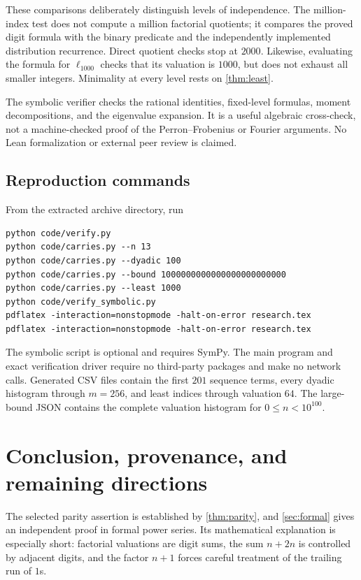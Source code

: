 \documentclass[11pt]{article}
\theoremstyle{definition}\newtheorem{definition}[theorem]{Definition}
\theoremstyle{remark}\newtheorem{remark}[theorem]{Remark}
\begin{document}
These comparisons deliberately distinguish levels of independence.
The million-index test does not compute a million factorial quotients;
it compares the proved digit formula with the binary predicate and the
independently implemented distribution recurrence. Direct quotient
checks stop at $2000$. Likewise, evaluating the formula for $\ell_{1000}$
checks that its valuation is $1000$, but does not exhaust all smaller
integers. Minimality at every level rests on \cref{thm:least}.

The symbolic verifier checks the rational identities, fixed-level
formulas, moment decompositions, and the eigenvalue expansion. It is a
useful algebraic cross-check, not a machine-checked proof of the
Perron--Frobenius or Fourier arguments. No Lean formalization or external
peer review is claimed.

\subsection{Reproduction commands}
From the extracted archive directory, run
\begin{lstlisting}
python code/verify.py
python code/carries.py --n 13
python code/carries.py --dyadic 100
python code/carries.py --bound 1000000000000000000000000
python code/carries.py --least 1000
python code/verify_symbolic.py
pdflatex -interaction=nonstopmode -halt-on-error research.tex
pdflatex -interaction=nonstopmode -halt-on-error research.tex
\end{lstlisting}
The symbolic script is optional and requires SymPy. The main program and
exact verification driver require no third-party packages and make no
network calls. Generated CSV files contain the first $201$ sequence
terms, every dyadic histogram through $m=256$, and least indices through
valuation $64$. The large-bound JSON contains the complete valuation
histogram for $0\leq n<10^{100}$.

\section{Conclusion, provenance, and remaining directions}\label{sec:conclusion}

The selected parity assertion is established by \cref{thm:parity}, and
\cref{sec:formal} gives an independent proof in formal power series.
Its mathematical explanation is especially short: factorial valuations
are digit sums, the sum $n+2n$ is controlled by adjacent digits, and the
factor $n+1$ forces careful treatment of the trailing run of $1$s.
\end{document}
